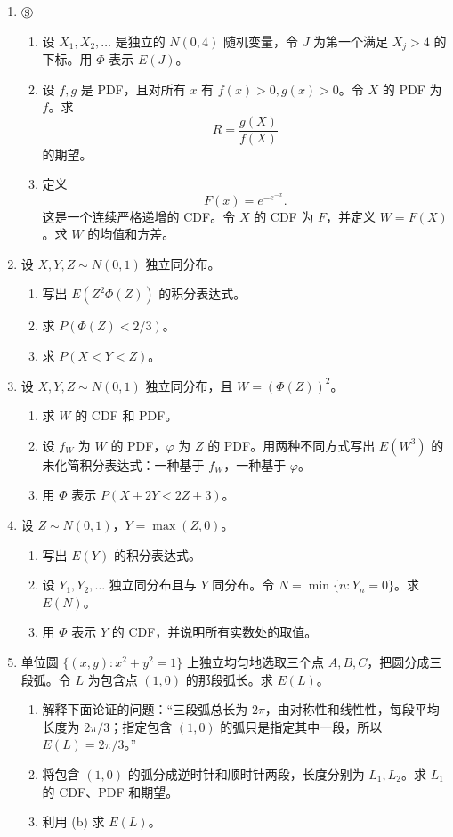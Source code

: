 \documentclass[UTF8, 12pt, fontset=fandol, oneside]{ctexart}
\begin{document}
\begin{enumerate}
  \item $\circledS$
  \begin{enumerate}
    \item 设 $X_1,X_2,\ldots$ 是独立的 $N(0,4)$ 随机变量，令 $J$ 为第一个满足 $X_j>4$ 的下标。用 $\Phi$ 表示 $E(J)$。
    \item 设 $f,g$ 是 PDF，且对所有 $x$ 有 $f(x)>0,g(x)>0$。令 $X$ 的 PDF 为 $f$。求
    \[
      R=\frac{g(X)}{f(X)}
    \]
    的期望。
    \item 定义
    \[
      F(x)=e^{-e^{-x}}.
    \]
    这是一个连续严格递增的 CDF。令 $X$ 的 CDF 为 $F$，并定义 $W=F(X)$。求 $W$ 的均值和方差。
  \end{enumerate}

  \item 设 $X,Y,Z\sim N(0,1)$ 独立同分布。
  \begin{enumerate}
    \item 写出 $E(Z^2\Phi(Z))$ 的积分表达式。
    \item 求 $P(\Phi(Z)<2/3)$。
    \item 求 $P(X<Y<Z)$。
  \end{enumerate}

  \item 设 $X,Y,Z\sim N(0,1)$ 独立同分布，且 $W=(\Phi(Z))^2$。
  \begin{enumerate}
    \item 求 $W$ 的 CDF 和 PDF。
    \item 设 $f_W$ 为 $W$ 的 PDF，$\varphi$ 为 $Z$ 的 PDF。用两种不同方式写出 $E(W^3)$ 的未化简积分表达式：一种基于 $f_W$，一种基于 $\varphi$。
    \item 用 $\Phi$ 表示 $P(X+2Y<2Z+3)$。
  \end{enumerate}

  \item 设 $Z\sim N(0,1)$，$Y=\max(Z,0)$。
  \begin{enumerate}
    \item 写出 $E(Y)$ 的积分表达式。
    \item 设 $Y_1,Y_2,\ldots$ 独立同分布且与 $Y$ 同分布。令 $N=\min\{n:Y_n=0\}$。求 $E(N)$。
    \item 用 $\Phi$ 表示 $Y$ 的 CDF，并说明所有实数处的取值。
  \end{enumerate}

  \item 单位圆 $\{(x,y):x^2+y^2=1\}$ 上独立均匀地选取三个点 $A,B,C$，把圆分成三段弧。令 $L$ 为包含点 $(1,0)$ 的那段弧长。求 $E(L)$。
  \begin{enumerate}
    \item 解释下面论证的问题：“三段弧总长为 $2\pi$，由对称性和线性性，每段平均长度为 $2\pi/3$；指定包含 $(1,0)$ 的弧只是指定其中一段，所以 $E(L)=2\pi/3$。”
    \item 将包含 $(1,0)$ 的弧分成逆时针和顺时针两段，长度分别为 $L_1,L_2$。求 $L_1$ 的 CDF、PDF 和期望。
    \item 利用 (b) 求 $E(L)$。
  \end{enumerate}


\end{enumerate}
\end{document}
